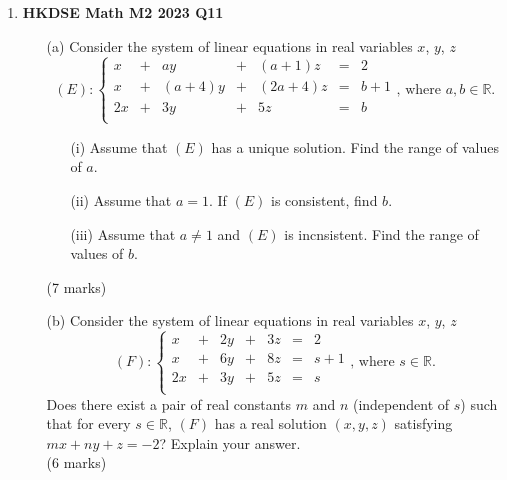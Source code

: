 \documentclass{report}
\begin{document}
\begin{enumerate}
	\item \textbf{HKDSE Math M2 2023 Q11}
	\begin{enumerate}
		\item [(a)] Consider the system of linear equations in real variables $x$, $y$, $z$
		$$(E) : \left\{\begin{matrix}
		x&	+&	ay&		+&	(a+1)z&		=&	2  \\
		x&	+&	(a+4)y&	+&	(2a+4)z&	=&	b+1 \\
		2x&	+&	3y&		+&	5z&			=&	b \\
		\end{matrix}\right. \text{,  where } a, b \in \mathbb{R} .$$
		\begin{enumerate}
			\item [(i)] Assume that $(E)$ has a unique solution. Find the range of values of $a$.
			\item [(ii)] Assume that $a = 1$. If $(E)$ is consistent, find $b$.
			\item [(iii)] Assume that $a \neq 1$ and $(E)$ is incnsistent. Find the range of values of $b$.
		\end{enumerate}
		(7 marks)
		\item [(b)] Consider the system of linear equations in real variables $x$, $y$, $z$
		$$(F) : \left\{\begin{matrix}
		x&	+&	2y&	+&	3z&	=&	2  \\
		x&	+&	6y&	+&	8z&	=&	s+1 \\
		2x&	+&	3y&	+&	5z&	=&	s \\
		\end{matrix}\right. \text{,  where } s \in \mathbb{R} .$$
		Does there exist a pair of real constants $m$ and $n$ (independent of $s$) such that for every $s\in\mathbb{R}$, $(F)$ has a real solution $(x,y,z)$ satisfying $mx + ny + z = -2$? Explain your answer. \\(6 marks) 
	\end{enumerate}

\end{enumerate}
\end{document}
